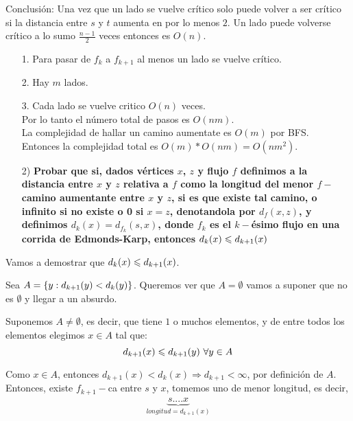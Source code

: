 \documentclass[12pt,a4paper]{article}
\begin{document}
Conclusión: Una vez que un lado se vuelve crítico solo puede volver a ser crítico 
si la distancia entre $s$ y $t$ aumenta en por lo menos $2$. Un lado puede volverse 
crítico a lo sumo $\frac{n-1}{2}$ veces entonces es $O(n)$.
\medskip

\begin{itemize}
    \item [1.] Para pasar de $f_{k}$ a $f_{k+1}$ al menos un lado se vuelve crítico.
    \item [2.] Hay $m$ lados.
    \item [3.] Cada lado se vuelve critico $O(n)$ veces.\\
        Por lo tanto el número total de pasos es $O(nm)$.\\
        La complejidad de hallar un camino aumentate es $O(m)$ por BFS.\\
        Entonces la complejidad total es $O(m)*O(nm)=O(nm^{2})$.
\end{itemize}

\begin{itemize}
    \item [2)] \textbf{Probar que si, dados vértices $x$, $z$ y flujo $f$ definimos a la distancia 
    entre $x$ y $z$ relativa a $f$ como la longitud del menor $f-$camino aumentante 
    entre $x$ y $z$, si es que existe tal camino, o infinito si no existe o 0 
    si $x = z$, denotandola por $d_{f} (x, z)$, y definimos 
    $d_{k}(x) = d_{f_{k}} (s, x)$, donde $f_{k}$ es el $k-$ésimo flujo en una 
    corrida de Edmonds-Karp, entonces $d_{k}(x) \leqslant d_{k+1}(x)$}
    \label{dem:dist}
\end{itemize}

Vamos a demostrar que $d_{k}(x) \leqslant d_{k+1}(x)$.
\medskip

Sea $A = \left\lbrace y: d_{k+1}(y) < d_{k}(y) \right\rbrace$. Queremos ver que $A = \emptyset$ vamos 
a suponer que no es $\emptyset$ y llegar a un absurdo.
\medskip

Suponemos $A \neq \emptyset$, es decir, que tiene $1$ o muchos elementos, y de 
entre todos los elementos elegimos $x \in A$ tal que:
\begin{equation}
    d_{k+1}(x) \leqslant d_{k+1}(y)\,\, \forall y \in A
    \label{EK:1}
\end{equation}

Como $x \in A$, entonces $d_{k+1}(x) < d_{k}(x) \Rightarrow d_{k+1} < \infty$, por 
definición de $A$.
Entonces, existe $f_{k+1}-$ca entre $s$ y $x$, tomemos uno de menor longitud, es decir,
\begin{align*}
    \underbrace{s .... x}_{longitud = d_{k+1}(x)}\\
\end{align*}
\end{document}
